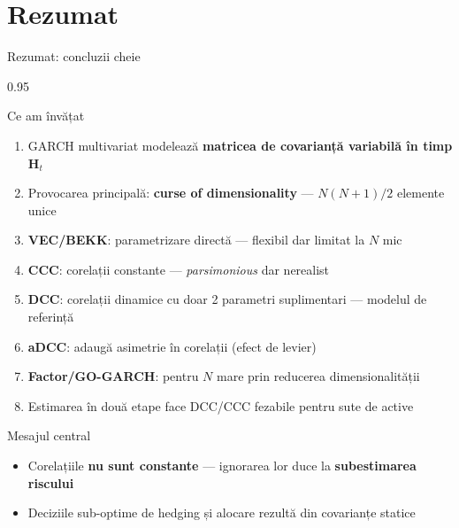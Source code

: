 \documentclass[9pt, aspectratio=169, t]{beamer}
\begin{document}
\section{Rezumat}

\begin{frame}{Rezumat: concluzii cheie}
    \begin{cminipage}{0.95\textwidth}
    {\footnotesize
    \begin{block}{Ce am învățat}
        \begin{enumerate}\setlength{\itemsep}{2pt}
            \item GARCH multivariat modelează \textbf{matricea de covarianță variabilă în timp} $\mathbf{H}_t$
            \item Provocarea principală: \textbf{curse of dimensionality} --- $N(N+1)/2$ elemente unice
            \item \textbf{VEC/BEKK}: parametrizare directă --- flexibil dar limitat la $N$ mic
            \item \textbf{CCC}: corelații constante --- \textit{parsimonious} dar nerealist
            \item \textbf{DCC}: corelații dinamice cu doar 2 parametri suplimentari --- modelul de referință
            \item \textbf{aDCC}: adaugă asimetrie în corelații (efect de levier)
            \item \textbf{Factor/GO-GARCH}: pentru $N$ mare prin reducerea dimensionalității
            \item Estimarea în două etape face DCC/CCC fezabile pentru sute de active
        \end{enumerate}
    \end{block}
    \begin{alertblock}{Mesajul central}
        \begin{itemize}\setlength{\itemsep}{0pt}
            \item Corelațiile \textbf{nu sunt constante} --- ignorarea lor duce la \textbf{subestimarea riscului}
            \item Deciziile sub-optime de hedging și alocare rezultă din covarianțe statice
        \end{itemize}
    \end{alertblock}
    }
    \end{cminipage}
\end{frame}
\end{document}
